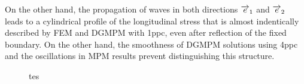 On the other hand, the propagation of waves in both directions ${\overrightarrow{e}}_1$ and ${\overrightarrow{e}}_2$ leads to a cylindrical profile of the longitudinal stress that is almost indentically described by FEM and DGMPM with 1ppc, even after reflection of the fixed boundary. On the other hand, the smoothness of DGMPM solutions using 4ppc and the oscillations in MPM results prevent distinguishing this structure.

\begin{figure}[h!]
  
  \caption{tes}
  \label{fig:elastlines}
\end{figure}


